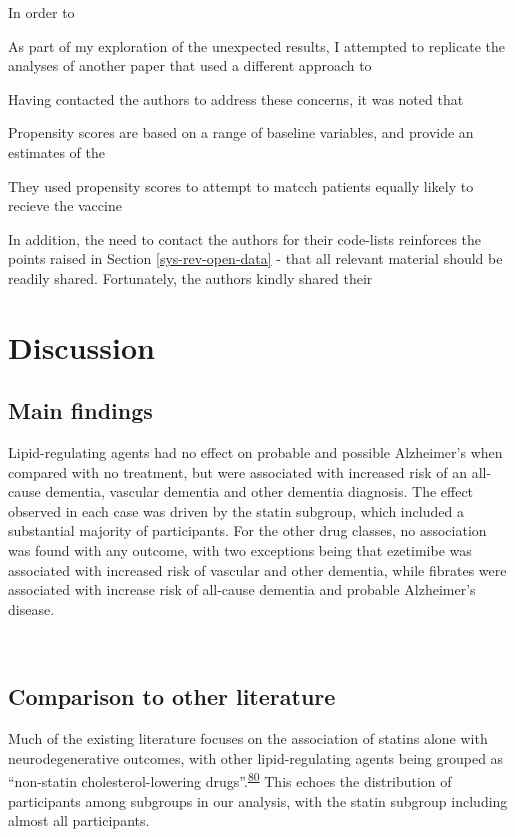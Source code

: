 \documentclass[a4paper, twoside]{templates/ociamthesis}
\begin{document}
In order to

As part of my exploration of the unexpected results, I attempted to replicate the analyses of another paper that used a different approach to

Having contacted the authors to address these concerns, it was noted that

Propensity scores are based on a range of baseline variables, and provide an estimates of the

They used propensity scores to attempt to matcch patients equally likely to recieve the vaccine

In addition, the need to contact the authors for their code-lists reinforces the points raised in Section \ref{sys-rev-open-data} - that all relevant material should be readily shared. Fortunately, the authors kindly shared their

\hypertarget{discussion-2}{%
\section{Discussion}\label{discussion-2}}

\hypertarget{main-findings}{%
\subsection{Main findings}\label{main-findings}}

Lipid-regulating agents had no effect on probable and possible Alzheimer's when compared with no treatment, but were associated with increased risk of an all-cause dementia, vascular dementia and other dementia diagnosis. The effect observed in each case was driven by the statin subgroup, which included a substantial majority of participants. For the other drug classes, no association was found with any outcome, with two exceptions being that ezetimibe was associated with increased risk of vascular and other dementia, while fibrates were associated with increase risk of all-cause dementia and probable Alzheimer's disease.

~

\hypertarget{comparison-to-other-literature}{%
\subsection{Comparison to other literature}\label{comparison-to-other-literature}}

Much of the existing literature focuses on the association of statins alone with neurodegenerative outcomes, with other lipid-regulating agents being grouped as ``non-statin cholesterol-lowering drugs''.\textsuperscript{\protect\hyperlink{ref-ancelin2012}{80}} This echoes the distribution of participants among subgroups in our analysis, with the statin subgroup including almost all participants.
\end{document}
